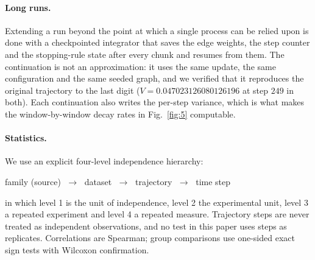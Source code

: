 \documentclass[11pt]{article}
\begin{document}
\paragraph{Long runs.} Extending a run beyond the point at which a single
process can be relied upon is done with a checkpointed integrator that saves
the edge weights, the step counter and the stopping-rule state after every
chunk and resumes from them. The continuation is not an approximation: it
uses the same update, the same configuration and the same seeded graph, and
we verified that it reproduces the original trajectory to the last digit
($V = 0.047023126080126196$ at step $249$ in both). Each continuation also
writes the per-step variance, which is what makes the window-by-window decay
rates in Fig.~\ref{fig:5} computable.

\paragraph{Statistics.} We use an explicit four-level independence hierarchy:
\begin{center}
  family (source) $\;\to\;$ dataset $\;\to\;$ trajectory $\;\to\;$ time step
\end{center}
in which level 1 is the unit of independence, level 2 the experimental unit,
level 3 a repeated experiment and level 4 a repeated measure. Trajectory steps
are never treated as independent observations, and no test in this paper uses
steps as replicates. Correlations are Spearman; group comparisons use
one-sided exact sign tests with Wilcoxon confirmation.
\end{document}
